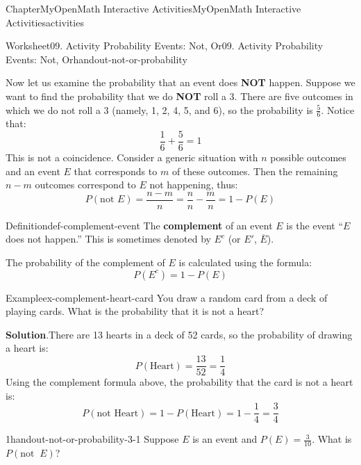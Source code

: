 \documentclass[oneside,10pt,]{book}
\newcommand{\blocktitlefont}{\relax}
\newcommand{\terminology}[1]{\textbf{#1}}
\begin{document}
\begin{chapterptx}{Chapter}{MyOpenMath Interactive Activities}{}{MyOpenMath Interactive Activities}{}{}{activities}
\begin{worksheet-section}{Worksheet}{09. Activity Probability Events: Not, Or}{}{09. Activity Probability Events: Not, Or}{}{}{handout-not-or-probability}
\par
Now let us examine the probability that an event does \terminology{NOT} happen. Suppose we want to find the probability that we do \terminology{NOT} roll a 3. There are five outcomes in which we do not roll a 3 (namely, 1, 2, 4, 5, and 6), so the probability is \(\frac{5}{6}\). Notice that:%
\begin{equation*}
\frac{1}{6} + \frac{5}{6} = 1
\end{equation*}
This is not a coincidence. Consider a generic situation with \(n\) possible outcomes and an event \(E\) that corresponds to \(m\) of these outcomes. Then the remaining \(n - m\) outcomes correspond to \(E\) not happening, thus:%
\begin{equation*}
P(\text{not } E) = \frac{n - m}{n} = \frac{n}{n} - \frac{m}{n} = 1 - P(E)
\end{equation*}
%
\begin{definition}{Definition}{}{def-complement-event}%
The \terminology{complement} of an event \(E\) is the event \textquotedblleft{}\(E\) does not happen.\textquotedblright{} This is sometimes denoted by \(E^c\) (or \(E'\), \(\overline{E}\)).%
\par
The probability of the complement of \(E\) is calculated using the formula:%
\begin{equation*}
P(E^c) = 1 - P(E)
\end{equation*}
%
\end{definition}
\begin{example}{Example}{}{ex-complement-heart-card}%
You draw a random card from a deck of playing cards. What is the probability that it is not a heart?%
\par\smallskip%
\noindent\textbf{\blocktitlefont Solution}.\hypertarget{ex-complement-heart-card-2}{}\quad{}There are 13 hearts in a deck of 52 cards, so the probability of drawing a heart is:%
\begin{equation*}
P(\text{Heart}) = \frac{13}{52} = \frac{1}{4}
\end{equation*}
Using the complement formula above, the probability that the card is not a heart is:%
\begin{equation*}
P(\text{not Heart}) = 1 - P(\text{Heart}) = 1 - \frac{1}{4} = \frac{3}{4}
\end{equation*}
%
\end{example}
\clearpage
\begin{divisionexercise}{1}{}{}{handout-not-or-probability-3-1}%
Suppose \(\displaystyle{E}\) is an event and \(\displaystyle{P}{\left({E}\right)}=\frac{{3}}{{10}}\). What is \(\displaystyle{P}{\left(\text{not }\ {E}\right)}\)?%

\end{divisionexercise}
\end{worksheet-section}
\end{chapterptx}
\end{document}
